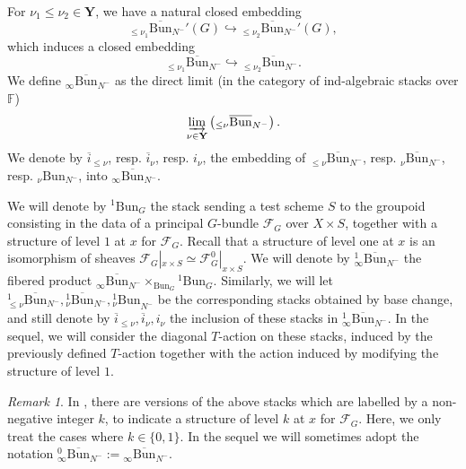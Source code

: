 \documentclass[11pt]{amsart}
\theoremstyle{plain}
\theoremstyle{remark}
\newtheorem{rem}[thm]{Remark}
\numberwithin{equation}{section}
\begin{document}
	For $\nu_1\leq \nu_2\in \mathbf{Y}$, we have a natural closed embedding 
	$$_{\leq\nu_1}\overline{\mathrm{Bun}}_{N^-}'(G)\hookrightarrow {_{\leq\nu_2}\overline{\mathrm{Bun}}_{N^-}'}(G),$$
	which induces a closed embedding 
	$$_{\leq\nu_1}\overline{\mathrm{Bun}}_{N^-}\hookrightarrow {_{\leq\nu_2}\overline{\mathrm{Bun}}_{N^-}}.$$
	We define ${_{\infty}\overline{\mathrm{Bun}}_{N^-}}$ as the direct limit (in the category of ind-algebraic stacks over $\mathbb{F}$) 
	$$\varinjlim_{\nu\in \mathbf{Y}} \left({_{\leq \nu}\overline{\mathrm{Bun}}_{N^-}}\right).$$
	We denote by $\overline{i}_{\leq\nu}$, resp. $\overline{i}_{\nu}$, resp. $i_\nu$, the embedding of $_{\leq\nu}\overline{\mathrm{Bun}}_{N^-}$, resp. $_{\nu}\overline{\mathrm{Bun}}_{N^-}$, resp. $_{\nu}\mathrm{Bun}_{N^-}$, into ${_{\infty}\overline{\mathrm{Bun}}_{N^-}}$.
	
	We will denote by ${^1\mathrm{Bun}}_G$ the stack sending a test scheme $S$ to the groupoid consisting in the data of a principal $G$-bundle $\mathcal{F}_G$ over $X\times S$, together with a structure of level $1$ at $x$ for $\mathcal{F}_G$. Recall that a structure of level one at $x$ is an isomorphism of sheaves $\mathcal{F}_G|_{x\times S}\simeq \mathcal{F}^0_G|_{x\times S}$. We will denote by ${^1_{\infty}\overline{\mathrm{Bun}}_{N^-}}$ the fibered product $_{\infty}\overline{\mathrm{Bun}}_{N^-}\times_{\mathrm{Bun}_G} {^1\mathrm{Bun}}_G$. Similarly, we will let ${^1_{\leq\nu}\overline{\mathrm{Bun}}_{N^-}},{^1_{\nu}\overline{\mathrm{Bun}}_{N^-}},{^1_{\nu}\mathrm{Bun}}_{N^-}$ be the corresponding stacks obtained by base change, and still denote by $\overline{i}_{\leq\nu},\overline{i}_{\nu},i_\nu$ the inclusion of these stacks in ${^1_{\infty}\overline{\mathrm{Bun}}_{N^-}}$. In the sequel, we will consider the diagonal $T$-action on these stacks, induced by the previously defined $T$-action together with the action induced by modifying the structure of level $1$.  
 \begin{rem}
     In \cite{ABBGM}, there are versions of the above stacks which are labelled by a non-negative integer $k$, to indicate a structure of level $k$ at $x$ for $\mathcal{F}_G$. Here, we only treat the cases where $k\in\{0,1\}$. In the sequel we will sometimes adopt the notation ${^0_{\infty}\overline{\mathrm{Bun}}_{N^-}}:={_{\infty}\overline{\mathrm{Bun}}_{N^-}}$.

 \end{rem}
\end{document}

